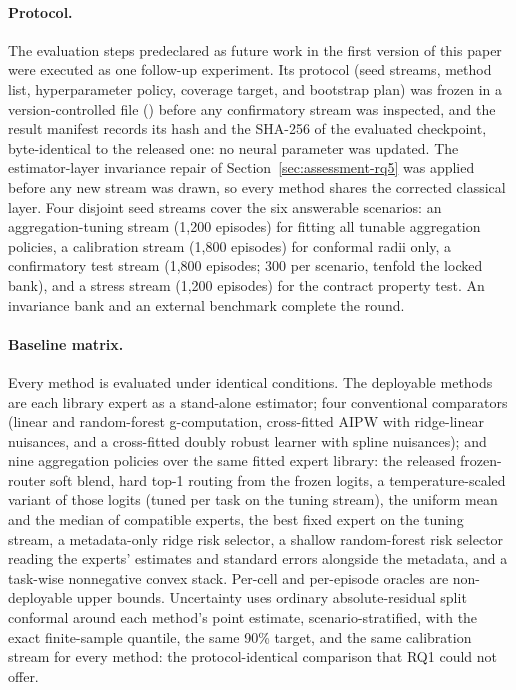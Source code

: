 \documentclass[electronics,article,submit,oneauthor]{Definitions/mdpi}
\begin{document}
\paragraph{Protocol.} The evaluation steps predeclared as future work in the first version of this paper were executed as one follow-up experiment. Its protocol (seed streams, method list, hyperparameter policy, coverage target, and bootstrap plan) was frozen in a version-controlled file () before any confirmatory stream was inspected, and the result manifest records its hash and the SHA-256 of the evaluated checkpoint, byte-identical to the released one: no neural parameter was updated. The estimator-layer invariance repair of Section~\ref{sec:assessment-rq5} was applied before any new stream was drawn, so every method shares the corrected classical layer. Four disjoint seed streams cover the six answerable scenarios: an aggregation-tuning stream (1,200 episodes) for fitting all tunable aggregation policies, a calibration stream (1,800 episodes) for conformal radii only, a confirmatory test stream (1,800 episodes; 300 per scenario, tenfold the locked bank), and a stress stream (1,200 episodes) for the contract property test. An invariance bank and an external benchmark complete the round.

\paragraph{Baseline matrix.} Every method is evaluated under identical conditions. The deployable methods are each library expert as a stand-alone estimator; four conventional comparators (linear and random-forest g-computation, cross-fitted AIPW with ridge-linear nuisances, and a cross-fitted doubly robust learner with spline nuisances); and nine aggregation policies over the same fitted expert library: the released frozen-router soft blend, hard top-1 routing from the frozen logits, a temperature-scaled variant of those logits (tuned per task on the tuning stream), the uniform mean and the median of compatible experts, the best fixed expert on the tuning stream, a metadata-only ridge risk selector, a shallow random-forest risk selector reading the experts' estimates and standard errors alongside the metadata, and a task-wise nonnegative convex stack. Per-cell and per-episode oracles are non-deployable upper bounds. Uncertainty uses ordinary absolute-residual split conformal around each method's point estimate, scenario-stratified, with the exact finite-sample quantile, the same 90\% target, and the same calibration stream for every method: the protocol-identical comparison that RQ1 could not offer.
\end{document}
